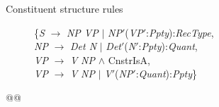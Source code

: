 \begin{description}
\item[Constituent structure rules] \mbox{}
  
  \begin{tabbing}
    \{\=\textit{S} $\longrightarrow$ \textit{NP VP} $\mid$ \textit{NP}$'$(\textit{VP}$'$:\textit{Ppty}):\textit{RecType},\\
    \>\textit{NP} $\longrightarrow$ \textit{Det N} $\mid$
    \textit{Det}$'$(\textit{N}$'$:\textit{Ppty}):\textit{Quant},\\
    \>\textit{VP} $\longrightarrow$ \textit{V} \textit{NP}
    \d{\d{$\wedge$}} CnstrIsA, \\
    \>\textit{VP} $\longrightarrow$ \textit{V} \textit{NP} $\mid$
    \textit{V}$'$(\textit{NP}$'$:\textit{Quant}):\textit{Ppty}\}

  \end{tabbing}

\end{description}
  




@@



 
 
 
   
